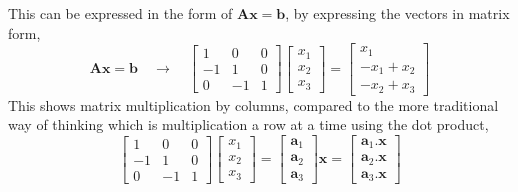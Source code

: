             This can be expressed in the form of \(\boldsymbol{Ax}=\boldsymbol{b}\), by expressing the vectors in matrix form,
            \begin{equation}
                \boldsymbol{Ax}=\boldsymbol{b} \quad \rightarrow \quad
                \begin{bmatrix}
                    1  & 0  & 0 \\
                    -1 & 1  & 0 \\
                    0  & -1 & 1
                \end{bmatrix}
                \begin{bmatrix}
                    x_1 \\
                    x_2 \\
                    x_3
                \end{bmatrix}
                =
                \begin{bmatrix}
                    x_1 \\
                    -x_1 + x_2\\
                    -x_2 + x_3
                \end{bmatrix}
            \end{equation}
            This shows matrix multiplication by columns, compared to the more traditional way of thinking which is multiplication a row at a time using the dot product,
            \begin{equation}
                \begin{bmatrix}
                    1  & 0  & 0 \\
                    -1 & 1  & 0 \\
                    0  & -1 & 1
                \end{bmatrix}
                \begin{bmatrix}
                    x_1 \\
                    x_2 \\
                    x_3
                \end{bmatrix}
                =
                \begin{bmatrix}
                    \boldsymbol{a}_1 \\
                    \boldsymbol{a}_2 \\
                    \boldsymbol{a}_3
                \end{bmatrix}
                \boldsymbol{x}
                =
                \begin{bmatrix}
                    \boldsymbol{a}_1 . \boldsymbol{x} \\
                    \boldsymbol{a}_2 . \boldsymbol{x} \\
                    \boldsymbol{a}_3 . \boldsymbol{x}
                \end{bmatrix}
            \end{equation}

